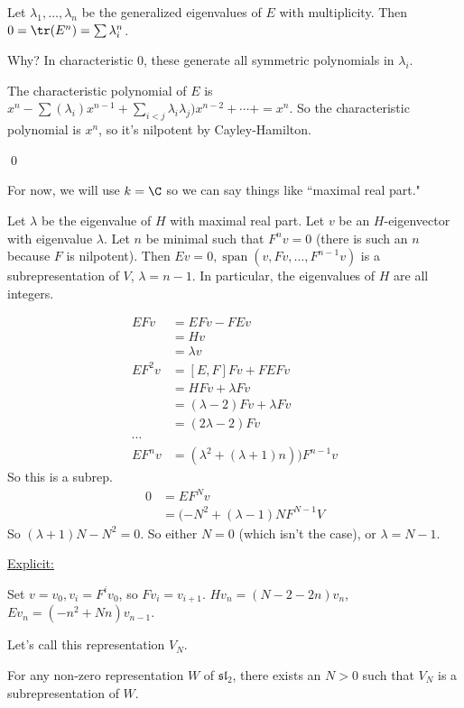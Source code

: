 \documentclass[x11names,reqno,14pt]{extarticle}
\newcommand{\mk}[1]{\mathfrak{#1}}
\renewcommand{\sl}{\mk{s}\mk{l}}
\DeclareMathOperator{\Span}{span}
\begin{document}
Let $\lambda_1,\dots,\lambda_n$ be the generalized eigenvalues of $E$ with multiplicity. Then $0 = \tr(E^n) = \sum \lambda_i^n$.

Why? In characteristic 0, these generate all symmetric polynomials in $\lambda_i$. 

The characteristic polynomial of $E$ is $x^n - \sum(\lambda_i)x^{n-1} + \sum_{i< j}\lambda_i\lambda_j)x^{n-2} + \cdots + = x^n$. So the characteristic polynomial is $x^n$, so it's nilpotent by Cayley-Hamilton.

\qed

For now, we will use $k = \C$ so we can say things like ``maximal real part." 

\lem

Let $\lambda$ be the eigenvalue of $H$ with maximal real part. Let $v$ be an $H$-eigenvector with eigenvalue $\lambda$. Let $n$ be minimal such that $F^nv = 0$ (there is such an $n$ because $F$ is nilpotent). Then $Ev = 0, \Span(v, Fv, \dots, F^{n-1}v)$ is a subrepresentation of $V$, $\lambda = n - 1$. In particular, the eigenvalues of $H$ are all integers. 

\proof

\begin{align*}
EFv & = EFv - FEv \\
& = Hv \\
& = \lambda v\\
EF^2v & = [E,F]Fv + FEFv \\
& = HFv + \lambda Fv \\
& = (\lambda-2)Fv + \lambda Fv \\
& = (2\lambda-2)Fv \\
\cdots & \\
EF^nv & = (\lambda^2 + (\lambda + 1)n))F^{n-1}v 
\end{align*}
So this is a subrep. 
\begin{align*}
0 & = EF^Nv \\
& = (-N^2 + (\lambda-1)NF^{N-1}V
\end{align*}
So $(\lambda+1)N - N^2 = 0$. So either $N = 0$ (which isn't the case), or $\lambda = N - 1$. 

\underline{Explicit:}

Set $v = v_0, v_i = F^iv_0$, so $Fv_i = v_{i+1}$. $Hv_n = (N - 2 - 2n)v_n$, $Ev_n = (-n^2 + Nn)v_{n-1}$.

Let's call this representation $V_N$.

\cor

For any non-zero representation $W$ of $\sl_2$, there exists an $N > 0$ such that $V_N$ is a subrepresentation of $W$. 
\end{document}
